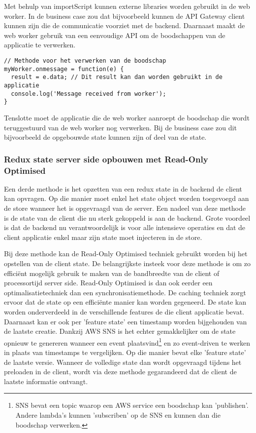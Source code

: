 Met behulp van importScript kunnen externe libraries worden gebruikt in de web worker. In de business case zou dat bijvoorbeeld kunnen de API Gateway client kunnen zijn die de communicatie voorziet met de backend. Daarnaast maakt de web worker gebruik van een eenvoudige API om de boodschappen van de applicatie te verwerken.

\begin{lstlisting}[caption=Voorbeeld van hoe de applicatie de respons van een web worker verwerkt]
// Methode voor het verwerken van de boodschap
myWorker.onmessage = function(e) {
  result = e.data; // Dit result kan dan worden gebruikt in de applicatie
  console.log('Message received from worker');
}
\end{lstlisting}

Tenslotte moet de applicatie die de web worker aanroept de boodschap die wordt teruggestuurd van de web worker nog verwerken. Bij de business case zou dit bijvoorbeeld de opgebouwde state kunnen zijn of deel van de state.

\subsubsection{Redux state server side opbouwen met Read-Only Optimised}
\label{sssec: redux-server-side}
Een derde methode is het opzetten van een redux state in de backend de client kan opvragen. Op die manier moet enkel het state object worden toegevoegd aan de store wanneer het is opgevraagd van de server. Een nadeel van deze methode is de state van de client die nu sterk gekoppeld is aan de backend. Grote voordeel is dat de backend nu verantwoordelijk is voor alle intensieve operaties en dat de client applicatie enkel maar zijn state moet injecteren in de store. 

Bij deze methode kan de Read-Only Optimised techniek gebruikt worden bij het opstellen van de client state. De belangrijkste insteek voor deze methode is om zo effici\"ent mogelijk gebruik te maken van de bandbreedte van de client of processortijd server side. Read-Only Optimised is dan ook eerder een optimalisatietechniek dan een synchronisatiemethode. De caching techniek zorgt ervoor dat de state op een effici\"ente manier kan worden gegeneerd. De state kan worden onderverdeeld in de verschillende features de die client applicatie bevat. Daarnaast kan er ook per 'feature state' een timestamp  worden bijgehouden van de laatste creatie. Dankzij AWS SNS is het echter gemakkelijker om de state opnieuw te genereren wanneer een event plaatsvind\footnote{SNS bevat een topic waarop een AWS service een boodschap kan 'publishen'. Andere lambda's kunnen 'subscriben' op de SNS en kunnen dan die boodschap verwerken.} en zo event-driven te werken in plaats van timestamps te vergelijken. Op die manier bevat elke 'feature state' de laatste versie. Wanneer de volledige state dan wordt opgevraagd tijdens het preloaden in de client, wordt via deze methode gegarandeerd dat de client de laatste informatie ontvangt.


